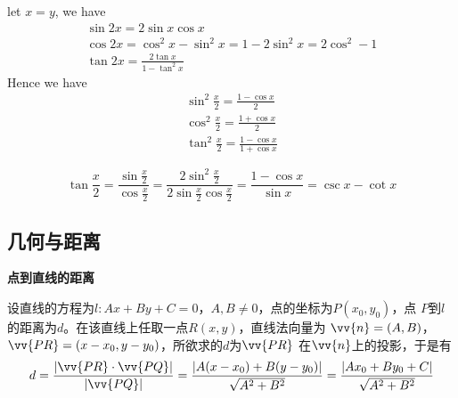 \documentclass[11pt]{article}
\begin{document}
let \(x=y\), we have
\begin{gather*}
\sin 2x=2\sin x\cos x\\
\cos 2x=\cos^2x-\sin^2x=1-2\sin^2 x=2\cos^2-1\\
\tan 2x=\frac{2\tan x}{1-\tan^2x}
\end{gather*}
Hence we have
\begin{gather*}
\sin^2\frac{x}{2}=\frac{1-\cos x}{2}\\
\cos^2\frac{x}{2}=\frac{1+\cos x}{2}\\
\tan^2\frac{x}{2}=\frac{1-\cos x}{1+\cos x}
\end{gather*}

\begin{equation*}
\tan\frac{x}{2}=\frac{\sin\frac{x}{2}}{\cos\frac{x}{2}}=
\frac{2\sin^2\frac{x}{2}}{2\sin\frac{x}{2}\cos\frac{x}{2}}=
\frac{1-\cos x}{\sin x}=\csc x-\cot x
\end{equation*}


\subsection{几何与距离}
\label{sec:org79af0bc}
\textbf{点到直线的距离}

设直线的方程为\(l:Ax+By+C=0\)，\(A,B\neq0\)，点的坐标为\(P(x_0,y_0)\)，点
\(P\)到\(l\)的距离为\(d\)。在该直线上任取一点\(R(x,y)\)，直线法向量为
\(\vv{n}=(A,B)\)，\(\vv{PR}=(x-x_0,y-y_0)\)，所欲求的\(d\)为\(\vv{PR}\)
在\(\vv{n}\)上的投影，于是有
\begin{equation*}
d=\frac{\abs{\vv{PR}\cdot\vv{PQ}}}{\abs{\vv{PQ}}}=
\frac{\abs{A(x-x_0)+B(y-y_0)}}{\sqrt{A^2+B^2}}=\frac{\abs{Ax_0+By_0+C}}{\sqrt{A^2+B^2}}
\end{equation*}
\end{document}
